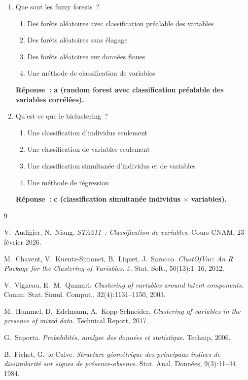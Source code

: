 \documentclass[a4paper,11pt]{article}
\theoremstyle{definition}
\theoremstyle{remark}
\begin{document}
\begin{enumerate}
  \item Que sont les fuzzy forests~?
    \begin{enumerate}
      \item Des for\^ets al\'eatoires avec classification pr\'ealable
        des variables
      \item Des for\^ets al\'eatoires sans \'elagage
      \item Des for\^ets al\'eatoires sur donn\'ees floues
      \item Une m\'ethode de classification de variables
    \end{enumerate}
    \textbf{R\'eponse~: a (random forest avec classification
    pr\'ealable des variables corr\'el\'ees).}

  \item Qu'est-ce que le biclustering~?
    \begin{enumerate}
      \item Une classification d'individus seulement
      \item Une classification de variables seulement
      \item Une classification simultan\'ee d'individus et de
        variables
      \item Une m\'ethode de r\'egression
    \end{enumerate}
    \textbf{R\'eponse~: c (classification simultan\'ee individus
    $\times$ variables).}

\end{enumerate}

\begin{thebibliography}{9}

  V.~Audigier, N.~Niang.
  \newblock \emph{STA211~: Classification de variables}.
  \newblock Cours CNAM, 23 f\'evrier 2026.

  M.~Chavent, V.~Kuentz-Simonet, B.~Liquet, J.~Saracco.
  \newblock \emph{ClustOfVar: An R Package for the Clustering of
    Variables}.
  \newblock J. Stat. Soft., 50(13):1--16, 2012.

  V.~Vigneau, E.~M.~Qannari.
  \newblock \emph{Clustering of variables around latent components}.
  \newblock Comm. Stat. Simul. Comput., 32(4):1131--1150, 2003.

  M.~Hummel, D.~Edelmann, A.~Kopp-Schneider.
  \newblock \emph{Clustering of variables in the presence of mixed
    data}.
  \newblock Technical Report, 2017.

  G.~Saporta.
  \newblock \emph{Probabilit\'es, analyse des donn\'ees et
    statistique}.
  \newblock Technip, 2006.

  B.~Fichet, G.~le Calve.
  \newblock \emph{Structure g\'eom\'etrique des principaux indices
    de dissimilarit\'e sur signes de pr\'esence-absence}.
  \newblock Stat. Anal. Donn\'ees, 9(3):11--44, 1984.

\end{thebibliography}
\end{document}
